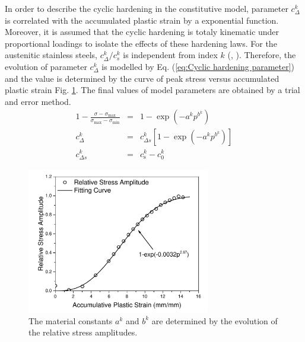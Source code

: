 \documentclass[final,5p,times,onecolumn,10pt,sort&compress]{elsarticle}
\begin{document}
In order to describe the cyclic hardening in the constitutive model, parameter $c_{\Delta}^{k}$ is correlated with the accumulated plastic strain by a exponential function. Moreover, it is assumed that the cyclic hardening is totaly kinematic under proportional loadings to isolate the effects of these hardening laws. For the austenitic stainless steels, $c_{\Delta}^{k}/c_{s}^{k}$ is independent from index $k$ (\citeauthor{Fang2015Cyclic}, \citeyear{Fang2015Cyclic}). Therefore, the evolution of parameter $c_{\Delta}^{k}$ is modelled by Eq. (\ref{eq:Cyclic hardening parameter}) and the value is determined by the curve of peak stress versus accumulated plastic strain Fig. \ref{fig:Stress Amplitude Evolution}. The final values of model parameters are obtained by a trial and error method.
\begin{eqnarray}\label{eq:Cyclic hardening parameter}
1-\frac{\sigma-\sigma_{\max}}{\sigma_{\max}-\sigma_{\min }}&=&1- \exp\left ( -a^{k} p^{b^{k}} \right )\\
c_{\Delta}^{k}&=&c_{\Delta s}^{k}\left[1- \exp\left ( -a^{k} p^{b^{k}} \right ) \right]\\
c_{\Delta s}^{k}&=&c_{\mathrm{s}}^{k}-c_{0}^{k}
\end{eqnarray}
\begin{figure}[ht]
\centering
\includegraphics[width=8cm]{RelativeStressAmplitudeEvolution.pdf}
\caption{The material constants $a^{k}$ and $b^{k}$ are determined by the evolution of the relative stress amplitudes.}
\label{fig:Stress Amplitude Evolution}
\end{figure}
\end{document}
